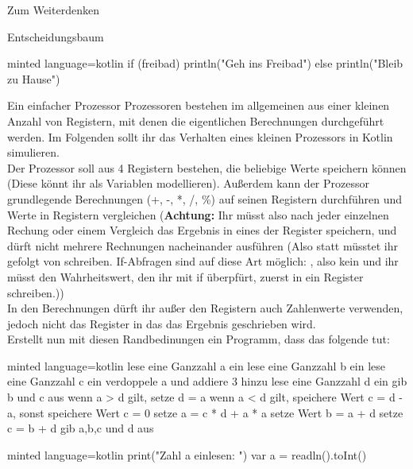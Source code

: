 \begin{task}[points=auto]{Zum Weiterdenken }
\begin{subtask*}[points=0]{Entscheidungsbaum}
\begin{solution}
\begin{codeBlock}[]{minted language=kotlin}
                if (freibad) {
                    println("Geh ins Freibad")
                } else {
                    println("Bleib zu Hause")
                }
            \end{codeBlock}
        \end{solution}
    \end{subtask*}
    \begin{subtask*}[points=0]{Ein einfacher Prozessor}
        Prozessoren bestehen im allgemeinen aus einer kleinen Anzahl von Registern, mit denen die eigentlichen Berechnungen durchgeführt werden. Im Folgenden sollt ihr das Verhalten eines kleinen Prozessors in Kotlin simulieren. \\
    Der Prozessor soll aus 4 Registern bestehen, die beliebige Werte speichern können (Diese könnt ihr als Variablen modellieren). Außerdem kann der Prozessor grundlegende Berechnungen ({\ttfamily +, -, *, /, \%}) auf seinen Registern durchführen und Werte in Registern vergleichen (\textbf{Achtung:} Ihr müsst also nach jeder einzelnen Rechung oder einem Vergleich das Ergebnis in eines der Register speichern, und dürft nicht mehrere Rechnungen nacheinander ausführen (Also statt  müsstet ihr  gefolgt von  schreiben. If-Abfragen sind auf diese Art möglich: , also kein  und ihr müsst den Wahrheitswert, den ihr mit if überpfürt, zuerst in ein Register schreiben.)) \\
        In den Berechnungen dürft ihr außer den Registern auch Zahlenwerte verwenden, jedoch nicht das Register in das das Ergebnis geschrieben wird.\\
        Erstellt nun mit diesen Randbedinungen ein Programm, dass das folgende tut: \\
        \begin{codeBlock}[]{minted language=kotlin}
            lese eine Ganzzahl a ein
            lese eine Ganzzahl b ein
            lese eine Ganzzahl c ein
            verdoppele a und addiere 3 hinzu
            lese eine Ganzzahl d ein
            gib b und c aus
            wenn a > d gilt, setze d = a
            wenn a < d gilt, speichere Wert c = d - a, sonst speichere Wert c = 0
            setze a = c * d + a * a
            setze Wert b = a + d
            setze c = b + d
            gib a,b,c und d aus
        \end{codeBlock}

        \begin{solution}
            \begin{codeBlock}[]{minted language=kotlin}
                print("Zahl a einlesen: ")
                var a = readln().toInt()


\end{codeBlock}
\end{solution}
\end{subtask*}
\end{task}
